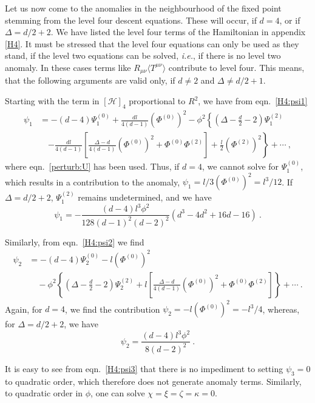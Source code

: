 \documentclass[a4paper,12pt]{article}
\begin{document}
Let us now come to the anomalies in the neighbourhood of the fixed
point stemming from the level four descent equations. These will
occur, if $d=4$, or if $\Delta=d/2+2$. We have listed the level four
terms of the Hamiltonian in appendix \ref{H4}. It must be stressed
that the level four equations can only be used as they stand, if the
level two equations can be solved, \emph{i.e.}, if there is no level two
anomaly. In these cases terms like $R_{\mu\nu} \langle T^{\mu\nu}
\rangle$ contribute to level four. 
This means, that the following arguments are valid only, if
$d\neq 2$ and $\Delta\neq d/2+1$. 


Starting with the term in $[\mathcal{H}]_4$ proportional to $R^2$, we
have from eqn.\ \eqref{H4:psi1} 
\begin{equation}
\label{perturb:psi1}
\begin{split}
  \psi_1 &= -(d-4) \Psi_1^{(0)} + \frac{dl}{4(d-1)} \left( \Phi^{(0)}
  \right)^2 -\phi^2 \left\{ \left( \Delta-\frac{d}2-2 \right)
  \Psi_1^{(2)} \right. \\
  &\quad \left.- \frac{dl}{4(d-1)} \left[ \frac{\Delta-d}{4(d-1)}
  \left( \Phi^{(0)} \right)^2 + \Phi^{(0)} \Phi^{(2)} \right]
  +\frac{l}2 \left( \Phi^{(2)} \right)^2 \right\} +\cdots~,
\end{split}
\end{equation}
where eqn.\ \eqref{perturb:U} has been used. Thus, if $d=4$, we cannot
solve for $\Psi_1^{(0)}$, which results in a contribution to the
anomaly, $\psi_1=l/3 \left( \Phi^{(0)} \right)^2= l^3 /12$. 
If $\Delta=d/2+2$, $\Psi_1^{(2)}$ remains undetermined, and we have
\[ \psi_1 = - \frac{(d-4)l^3\phi^2}{128(d-1)^2(d-2)^2}
(d^3-4d^2+16d-16)~. \]

Similarly, from eqn.\ \eqref{H4:psi2} we find
\begin{equation}
\label{perturb:psi2}
\begin{split}
  \psi_2 &= -(d-4) \Psi_2^{(0)} -l \left( \Phi^{(0)} \right)^2 \\
  &\quad -\phi^2 \left\{ \left( \Delta-\frac{d}2-2\right) \Psi_2^{(2)}
  +l \left[ \frac{\Delta-d}{4(d-1)} \left( \Phi^{(0)} \right)^2 +
  \Phi^{(0)} \Phi^{(2)} \right]\right\} +\cdots~.
\end{split}
\end{equation}
Again, for $d=4$, we find the contribution $\psi_2 = -l
\left(\Phi^{(0)}\right)^2 = -l^3/4$, whereas, for $\Delta=d/2+2$, we
have
\[ \psi_2 = \frac{(d-4)l^3\phi^2}{8(d-2)^2}~. \]

It is easy to see from eqn.\ \eqref{H4:psi3} that there is no
impediment to setting $\psi_3=0$ to quadratic order, which therefore
does not generate anomaly terms. Similarly, to quadratic order in
$\phi$, one can solve $\chi=\xi=\zeta=\kappa=0$. 
\end{document}
